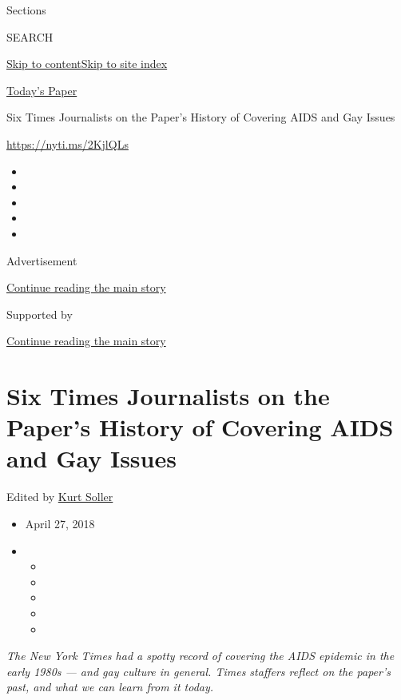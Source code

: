 Sections

SEARCH

\protect\hyperlink{site-content}{Skip to
content}\protect\hyperlink{site-index}{Skip to site index}

\href{https://myaccount.nytimes3xbfgragh.onion/auth/login?response_type=cookie\&client_id=vi}{}

\href{https://www.nytimes3xbfgragh.onion/section/todayspaper}{Today's
Paper}

Six Times Journalists on the Paper's History of Covering AIDS and Gay
Issues

\url{https://nyti.ms/2KjlQLs}

\begin{itemize}
\item
\item
\item
\item
\item
\end{itemize}

Advertisement

\protect\hyperlink{after-top}{Continue reading the main story}

Supported by

\protect\hyperlink{after-sponsor}{Continue reading the main story}

\hypertarget{six-times-journalists-on-the-papers-history-of-covering-aids-and-gay-issues}{%
\section{Six Times Journalists on the Paper's History of Covering AIDS
and Gay
Issues}\label{six-times-journalists-on-the-papers-history-of-covering-aids-and-gay-issues}}

Edited by \href{https://www.nytimes3xbfgragh.onion/by/kurt-soller}{Kurt
Soller}

\begin{itemize}
\item
  April 27, 2018
\item
  \begin{itemize}
  \item
  \item
  \item
  \item
  \item
  \end{itemize}
\end{itemize}

\emph{The New York Times had a spotty record of covering the AIDS
epidemic in the early 1980s --- and gay culture in general. Times
staffers reflect on the paper's past, and what we can learn from it
today.}

